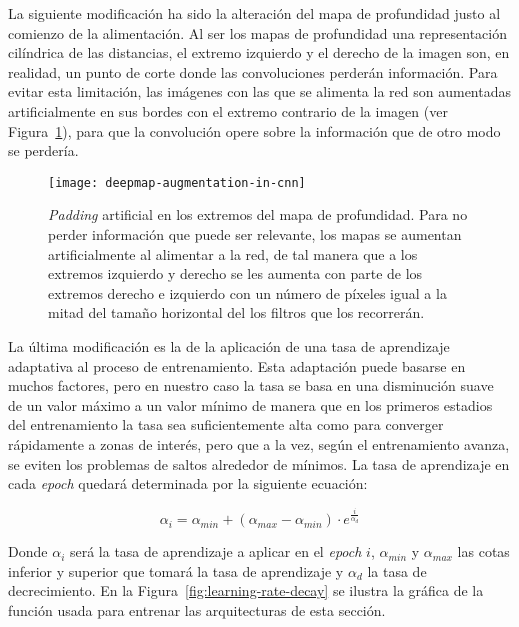 La siguiente modificación ha sido la alteración del mapa de profundidad justo al comienzo de la alimentación. Al ser los mapas de profundidad una representación cilíndrica de las distancias, el extremo izquierdo y el derecho de la imagen son, en realidad, un punto de corte donde las convoluciones perderán información. Para evitar esta limitación, las imágenes con las que se alimenta la red son aumentadas artificialmente en sus bordes con el extremo contrario de la imagen (ver Figura~\ref{fig:deepmap-augmentation-in-cnn}), para que la convolución opere sobre la información que de otro modo se perdería.

\begin{figure}
	\centering
	\texttt{[image: deepmap-augmentation-in-cnn]}
	\caption[\textit{Padding} artificial en los extremos del mapa de profundidad]{\textit{Padding} artificial en los extremos del mapa de profundidad. Para no perder información que puede ser relevante, los mapas se aumentan artificialmente al alimentar a la red, de tal manera que a los extremos izquierdo y derecho se les aumenta con parte de los extremos derecho e izquierdo con un número de píxeles igual a la mitad del tamaño horizontal del los filtros que los recorrerán.}
	\label{fig:deepmap-augmentation-in-cnn}
\end{figure}

La última modificación es la de la aplicación de una tasa de aprendizaje adaptativa al proceso de entrenamiento. Esta adaptación puede basarse en muchos factores, pero en nuestro caso la tasa se basa en una disminución suave de un valor máximo a un valor mínimo de manera que en los primeros estadios del entrenamiento la tasa sea suficientemente alta como para converger rápidamente a zonas de interés, pero que a la vez, según el entrenamiento avanza, se eviten los problemas de saltos alrededor de mínimos. La tasa de aprendizaje en cada \textit{epoch} quedará determinada por la siguiente ecuación:

\begin{equation}
    \alpha_i = \alpha_{min} + (\alpha_{max} - \alpha_{min}) \cdot e^\frac{i}{\alpha_d}
	\label{eq:learning-rate-decay}
\end{equation}

Donde $\alpha_i$ será la tasa de aprendizaje a aplicar en el \textit{epoch} $i$, $\alpha_{min}$ y $\alpha_{max}$ las cotas inferior y superior que tomará la tasa de aprendizaje y $\alpha_d$ la tasa de decrecimiento. En la Figura~\ref{fig:learning-rate-decay} se ilustra la gráfica de la función usada para entrenar las arquitecturas de esta sección.

